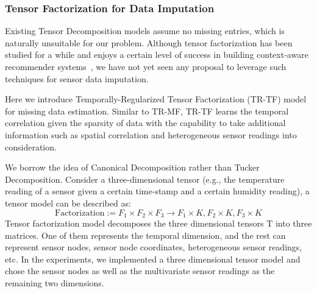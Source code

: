 \subsubsection{Tensor Factorization for Data Imputation} \label{sec:tfmissing}

Existing Tensor Decomposition models assume no missing entries, which is naturally unsuitable for our problem.
Although tensor factorization has been studied for a while and enjoys a certain level of success in building context-aware 
recommender systems~\cite{karatzoglou2010multiverse,rendle2010pairwise}, we have not yet seen any proposal to leverage 
such techniques for sensor data imputation.

Here we introduce Temporally-Regularized Tensor Factorization (TR-TF) model for missing data estimation. 
Similar to TR-MF, TR-TF learns the temporal correlation given the sparsity of data with the capability to take additional information such as spatial correlation and heterogeneous sensor readings into consideration.

We borrow the idea of Canonical Decomposition rather than Tucker Decomposition.
Consider a three-dimensional tensor (e.g., the temperature reading of a sensor given a certain time-stamp and a certain humidity reading), a tensor model can be described as:
\begin{equation*}
\mbox{Factorization} :=  F_1 \times  F_2 \times F_3 \rightarrow F_1 \times K, F_2 \times K, F_3 \times K
\end{equation*}
Tensor factorization model decomposes the three dimensional tensors T into three matrices. One of them represents the temporal dimension, and the rest can represent sensor nodes, sensor node coordinates, heterogeneous sensor readings, etc. In the experiments, we implemented a three dimensional tensor model and chose the sensor nodes as well as the multivariate sensor readings as the remaining two dimensions.

